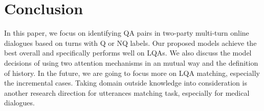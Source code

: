 \section{Conclusion}
\label{sec:conclusion}
In this paper, we focus on identifying QA pairs in two-party multi-turn online dialogues based on turns with Q or NQ labels. Our proposed models achieve the best overall and specifically performs well on LQAs. We also discuss the model decisions of using two attention mechanisms in an mutual way and the definition of history. In the future, we are going to focus more on LQA matching, especially the incremental cases. Taking domain outside knowledge into consideration is another research direction for utterances matching task, especially for medical dialogues.